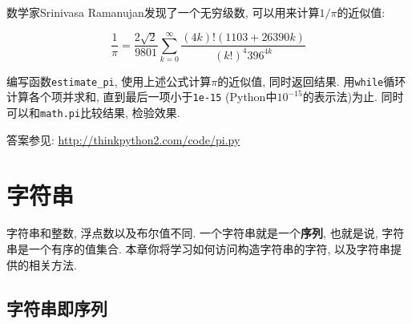 \documentclass[10pt]{book}
\begin{document}
\begin{exercise}
数学家Srinivasa Ramanujan发现了一个无穷级数, 
可以用来计算$1 / \pi$的近似值:

\[ \frac{1}{\pi} = \frac{2\sqrt{2}}{9801} 
\sum^\infty_{k=0} \frac{(4k)!(1103+26390k)}{(k!)^4 396^{4k}} \]

编写函数\verb"estimate_pi", 使用上述公式计算$\pi$的近似值, 
同时返回结果. 用{\tt while}循环计算各个项并求和, 直到最后一项小于{\tt 1e-15}
(Python中$10^{-15}$的表示法)为止. 
同时可以和{\tt math.pi}比较结果, 检验效果. 

答案参见: \url{http://thinkpython2.com/code/pi.py}

\end{exercise}

\chapter{字符串}
\label{strings}

字符串和整数, 浮点数以及布尔值不同. 
一个字符串就是一个{\bf 序列}, 也就是说, 字符串是一个有序的值集合. 
本章你将学习如何访问构造字符串的字符, 以及字符串提供的相关方法. 

\section{字符串即序列}
\end{document}
